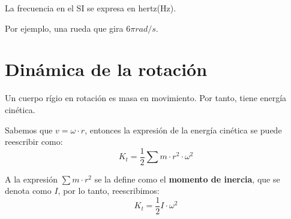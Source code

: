 \documentclass[12pt]{article}
\begin{document}
La frecuencia en el SI se expresa en hertz(Hz).

Por ejemplo, una rueda que gira \(6\pi rad/s\).

\section{Dinámica de la rotación}

Un cuerpo rígio en rotación es masa en movimiento.
Por tanto, 
tiene energía cinética.

Sabemos que \(v = \omega \cdot r\),
entonces la expresión de la energía cinética se puede reescribir como:
\begin{equation}
    K_{t} = \frac{1}{2}\sum m\cdot r^{2} \cdot \omega^{2}
\end{equation}

A la expresión \(\sum m\cdot r^{2}\) se la define como el 
\textbf{momento de inercia}, que se denota como \(I\),
por lo tanto, reescribimos:
\begin{equation}
    K_{t} = \frac{1}{2} I \cdot \omega^{2}
\end{equation}
\end{document}
